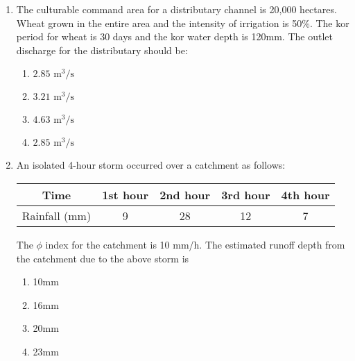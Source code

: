 \documentclass[journal]{IEEEtran}
\begin{document}
\begin{enumerate}
{        }
    \item{
     
           The culturable command area for a distributary channel is 20,000 hectares. Wheat grown in the entire area and the intensity of irrigation is 50\%. The kor period for wheat is 30 days and the kor water depth is 120mm. The outlet discharge for the distributary should be:\hfill
                
            \begin{multicols}{4}
                \begin{enumerate}
                	\item $2.85 \text{ m}^3/\text{s}$ 
                	
                	\item $3.21 \text{ m}^3/\text{s}$ 
                	
                	\item $4.63 \text{ m}^3/\text{s}$ 
                	
                	\item $2.85 \text{ m}^3/\text{s}$
                \end{enumerate}
            \end{multicols}
        
        }
 	\item{
        	An isolated 4-hour storm occurred over a catchment as follows:
        	
        	\begin{center}
        		\begin{tabular}{|c|c|c|c|c|}
        			\hline
        			Time & 1st hour & 2nd hour & 3rd hour & 4th hour \\
        			\hline
        			Rainfall (mm) & 9 & 28 & 12 & 7 \\
        			\hline
        		\end{tabular}
        	\end{center}
        	
        	The $\phi$ index for the catchment is 10 mm/h. The estimated runoff depth from the catchment due to the above storm is\text{ }
        	\hfill
        	
        	
        	\begin{multicols}{4}
        		\begin{enumerate}
        			\item 10mm
        			\item 16mm
        			\item 20mm
        			\item 23mm
        		\end{enumerate}
        	\end{multicols}
        	
}
\end{enumerate}
\end{document}
